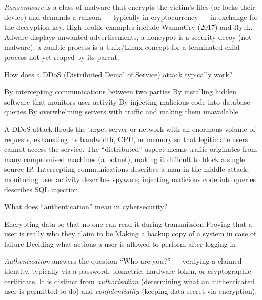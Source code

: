 \documentclass[answers]{exam}
\begin{document}
\begin{questions}
\begin{solution}
    \textit{Ransomware} is a class of malware that encrypts the victim's files (or locks their device) and demands a ransom --- typically in cryptocurrency --- in exchange for the decryption key.
    High-profile examples include WannaCry (2017) and Ryuk.
    Adware displays unwanted advertisements; a honeypot is a security decoy (not malware); a zombie process is a Unix/Linux concept for a terminated child process not yet reaped by its parent.
\end{solution}

\question How does a DDoS (Distributed Denial of Service) attack typically work?

\begin{choices}
    \choice By intercepting communications between two parties
    \choice By installing hidden software that monitors user activity
    \choice By injecting malicious code into database queries
    \correctchoice By overwhelming servers with traffic and making them unavailable
\end{choices}

\begin{solution}
    A DDoS attack floods the target server or network with an enormous volume of requests, exhausting its bandwidth, CPU, or memory so that legitimate users cannot access the service.
    The ``distributed'' aspect means traffic originates from many compromised machines (a botnet), making it difficult to block a single source IP.
    Intercepting communications describes a man-in-the-middle attack; monitoring user activity describes spyware; injecting malicious code into queries describes SQL injection.
\end{solution}

\question What does ``authentication'' mean in cybersecurity?

\begin{choices}
    \choice Encrypting data so that no one can read it during transmission
    \correctchoice Proving that a user is really who they claim to be
    \choice Making a backup copy of a system in case of failure
    \choice Deciding what actions a user is allowed to perform after logging in
\end{choices}

\begin{solution}
    \textit{Authentication} answers the question ``Who are you?'' --- verifying a claimed identity, typically via a password, biometric, hardware token, or cryptographic certificate.
    It is distinct from \textit{authorisation} (determining what an authenticated user is permitted to do) and \textit{confidentiality} (keeping data secret via encryption).
\end{solution}


\end{questions}
\end{document}
